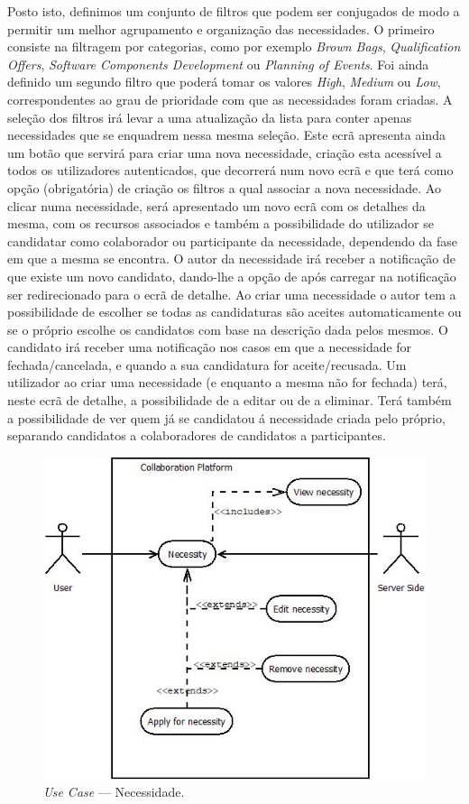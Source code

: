 Posto isto, definimos um conjunto de filtros que podem ser conjugados de modo a permitir um melhor agrupamento e organização das necessidades. O primeiro consiste na filtragem por categorias, como por exemplo \textit{Brown Bags}, 
\textit{Qualification Offers}, \textit{Software Components Development} ou \textit{Planning of Events}. 
Foi ainda definido um segundo filtro que poderá tomar os valores \textit{High}, \textit{Medium} ou \textit{Low}, 
correspondentes ao grau de prioridade com que as necessidades foram criadas. 
A seleção dos filtros irá levar a uma atualização da lista para conter apenas necessidades que se enquadrem nessa mesma seleção. 
Este ecrã apresenta ainda um botão que servirá para criar uma nova necessidade, criação esta acessível a todos os utilizadores autenticados, 
que decorrerá num novo ecrã e que terá como opção (obrigatória) de criação os filtros a qual associar a nova necessidade. 
Ao clicar numa necessidade, será apresentado um novo ecrã com os detalhes da mesma, com os recursos associados e também a possibilidade do utilizador se candidatar como colaborador ou participante da necessidade, dependendo da fase em que a mesma se encontra. O autor da necessidade irá receber a notificação de que existe um novo candidato, 
dando-lhe a opção de após carregar na notificação ser redirecionado para o ecrã de detalhe. 
Ao criar uma necessidade o autor tem a possibilidade de escolher se todas as candidaturas são aceites automaticamente ou se o próprio escolhe os candidatos com base na descrição dada pelos mesmos.  
O candidato irá receber uma notificação nos casos em que a necessidade for fechada/cancelada, e quando a sua candidatura for aceite/recusada. 
Um utilizador ao criar uma necessidade (e enquanto a mesma não for fechada) terá, neste ecrã de detalhe, a possibilidade de a editar ou de a eliminar. 
Terá também a possibilidade de ver quem já se candidatou á necessidade criada pelo próprio, separando candidatos a colaboradores de candidatos a participantes. 


\begin{figure}[H]
    \centering
    \includegraphics[scale=0.6]{figures/Necessity.jpeg}
    \caption{\textit{Use Case} --- Necessidade.}\label{fig:uc:necessity}
\end{figure}

